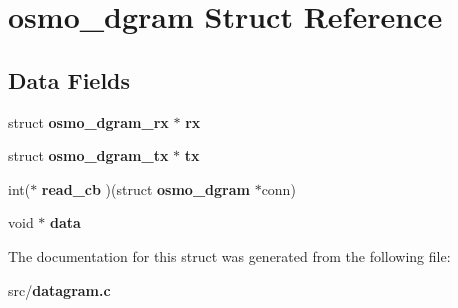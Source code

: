 \section{osmo\+\_\+dgram Struct Reference}
\label{structosmo__dgram}
\subsection*{Data Fields}
\begin{DoxyCompactItemize}
\item 
struct {\bf osmo\+\_\+dgram\+\_\+rx} $\ast$ {\bfseries rx}\label{structosmo__dgram_a3d782cbe3037ab44f4fa68834827dfcf}

\item 
struct {\bf osmo\+\_\+dgram\+\_\+tx} $\ast$ {\bfseries tx}\label{structosmo__dgram_ad1f75658d60ee1abab43d801494ba419}

\item 
int($\ast$ {\bfseries read\+\_\+cb} )(struct {\bf osmo\+\_\+dgram} $\ast$conn)\label{structosmo__dgram_a102cca53faaec53af52f7ae59ec8fc7d}

\item 
void $\ast$ {\bfseries data}\label{structosmo__dgram_a42d2003165caffffc96e9e22fef8db11}

\end{DoxyCompactItemize}


The documentation for this struct was generated from the following file\+:\begin{DoxyCompactItemize}
\item 
src/{\bf datagram.\+c}\end{DoxyCompactItemize}
